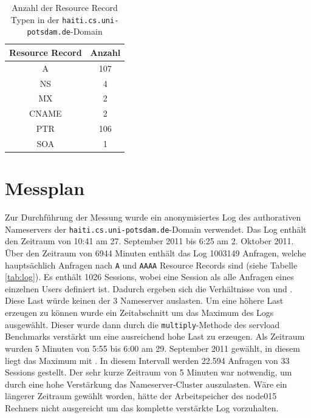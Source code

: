 \documentclass[a4paper, 12pt, BCOR10mm, DIV12, toc=bibliography, toc=listof, german]{scrbook}
\begin{document}
		\begin{table}
			\centering
			\begin{tabular}{|c|c|}\hline
				Resource Record & Anzahl \\\hline\hline
				A & 107 \\
				NS & 4 \\
				MX & 2 \\
				CNAME & 2 \\
				PTR & 106 \\
				SOA & 1 \\\hline
			\end{tabular}
			\caption{Anzahl der Resource Record Typen in der \texttt{haiti.cs.uni-potsdam.de}-Domain}
			\label{tab:rr-domain}
		\end{table}
			

		\section{Messplan} %
		\label{sec:messplan}

		Zur Durchführung der  Messung wurde ein anonymisiertes Log des authorativen Nameservers der
		\texttt{haiti.cs.uni-potsdam.de}-Domain verwendet. Das Log enthält den Zeitraum von 10:41 am 27.
		September 2011 bis 6:25 am 2. Oktober 2011. Über den Zeitraum von 6944 Minuten enthält das Log
		1003149 Anfragen, welche hauptsächlich Anfragen nach \texttt{A} und \texttt{AAAA} Resource
		Records sind (siehe Tabelle \ref{tab:log}). Es enthält 1026 Sessions, wobei eine Session als
		alle Anfragen eines einzelnen Users definiert ist. Dadurch ergeben sich die Verhältnisse von
		\unit[9,33]{} und \unit[977,63]{}. Diese
		Last würde keinen der 3 Nameserver auslasten. Um eine höhere Last erzeugen zu können wurde ein
		Zeitabschnitt um das Maximum des Logs ausgewählt. Dieser wurde dann durch die
		\texttt{multiply}-Methode des servload Benchmarks verstärkt um eine ausreichend hohe Last zu
		erzeugen. Als Zeitraum wurden 5 Minuten von 5:55 bis 6:00 am 29. September 2011 gewählt, in
		diesem liegt das Maximum mit \unit[204]{}. In diesem Intervall
		werden 22.594 Anfragen von 33 Sessions gestellt. Der sehr kurze Zeitraum von 5 Minuten war
		notwendig, um durch eine hohe Verstärkung das Nameserver-Cluster auszulasten. Wäre ein
		längerer Zeitraum gewählt worden, hätte der Arbeitspeicher des node015 Rechners nicht
		ausgereicht um das komplette verstärkte Log vorzuhalten.
		
\end{document}
